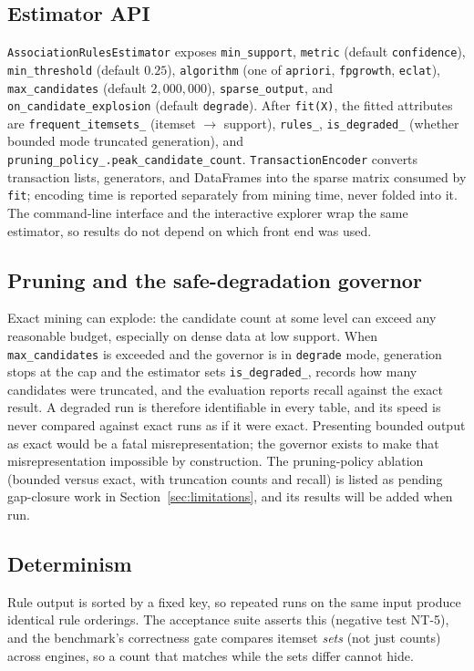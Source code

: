 \documentclass[twocolumn,10pt]{article}
\begin{document}
\subsection{Estimator API}
\texttt{AssociationRulesEstimator} exposes
\texttt{min\_support}, \texttt{metric} (default \texttt{confidence}),
\texttt{min\_threshold} (default $0.25$), \texttt{algorithm} (one of
\texttt{apriori}, \texttt{fpgrowth}, \texttt{eclat}),
\texttt{max\_candidates} (default $2{,}000{,}000$),
\texttt{sparse\_output}, and \texttt{on\_candidate\_explosion}
(default \texttt{degrade}). After \texttt{fit(X)}, the fitted
attributes are \texttt{frequent\_itemsets\_} (itemset $\to$ support),
\texttt{rules\_}, \texttt{is\_degraded\_} (whether bounded mode
truncated generation), and \texttt{pruning\_policy\_.peak\_candidate\_count}.
\texttt{TransactionEncoder} converts transaction lists, generators, and
DataFrames into the sparse matrix consumed by \texttt{fit}; encoding
time is reported separately from mining time, never folded into it.
The command-line interface and the interactive explorer wrap the same
estimator, so results do not depend on which front end was used.

\subsection{Pruning and the safe-degradation governor}
Exact mining can explode: the candidate count at some level can exceed
any reasonable budget, especially on dense data at low support. When
\texttt{max\_candidates} is exceeded and the governor is in
\texttt{degrade} mode, generation stops at the cap and the estimator
sets \texttt{is\_degraded\_}, records how many candidates were
truncated, and the evaluation reports recall against the exact result.
A degraded run is therefore identifiable in every table, and its speed
is never compared against exact runs as if it were exact. Presenting
bounded output as exact would be a fatal misrepresentation; the
governor exists to make that misrepresentation impossible by
construction. The pruning-policy ablation (bounded versus exact, with
truncation counts and recall) is listed as pending gap-closure work in
Section~\ref{sec:limitations}, and its results will be added when run.

\subsection{Determinism}
Rule output is sorted by a fixed key, so repeated runs on the same
input produce identical rule orderings. The acceptance suite asserts
this (negative test NT-5), and the benchmark's correctness gate
compares itemset \emph{sets} (not just counts) across engines, so a
count that matches while the sets differ cannot hide.
\end{document}
